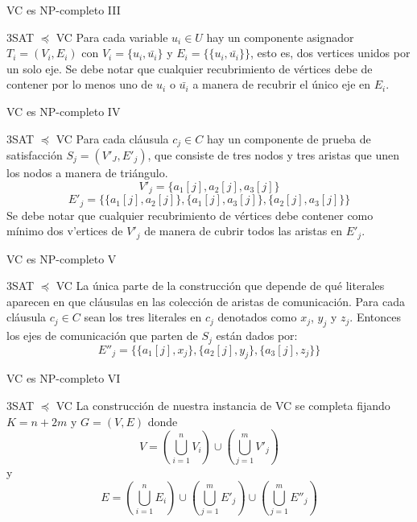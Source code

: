 \documentclass[10pt, mathserif, profesionalfont]{beamer}
\begin{document}
\begin{frame}{VC es NP-completo III}
    
\begin{block}{3SAT $\preceq$ VC}    
Para cada variable $u_i \in U$ hay un componente asignador $T_i=(V_i,E_i)$ con $V_i=\{u_i, \bar{u_i}\}$ y $E_i=\{\{u_i, \bar{u_i}\}\}$, esto es, dos vertices unidos por un solo eje. Se debe notar que cualquier recubrimiento de vértices debe de contener por lo menos uno de $u_i$ o $\bar{u_i}$ a manera de recubrir el único eje en $E_i$.
\end{block}

\end{frame}


\begin{frame}{VC es NP-completo IV}

\begin{block}{3SAT $\preceq$ VC}    
Para cada cláusula $c_j \in C$ hay un componente de prueba de satisfacción $S_j=(V'_J,E'_j)$, que consiste de tres nodos y tres aristas que unen los nodos a manera de triángulo.
\[V'_j=\{a_1[j],a_2[j],a_3[j]\}\]
\[E'_j=\{\{a_1[j],a_2[j]\},\{a_1[j],a_3[j]\},\{a_2[j],a_3[j]\}\}\]
Se debe notar que cualquier recubrimiento de vértices debe contener como mínimo dos v'ertices de $V'_j$ de manera de cubrir todos las aristas en $E'_j$.
\end{block}

\end{frame}


\begin{frame}{VC es NP-completo V}

\begin{block}{3SAT $\preceq$ VC}    
La única parte de la construcción que depende de qué literales aparecen en que cláusulas en las colección de aristas de comunicación. Para cada cláusula $c_j\in C$ sean los tres literales en $c_j$ denotados como $x_j$, $y_j$ y $z_j$. Entonces los ejes de comunicación que parten de $S_j$ están dados por:
\[E''_j=\{ \{a_1[j],x_j\}, \{a_2[j],y_j\}, \{a_3[j],z_j\} \}\]
\end{block}

\end{frame}


\begin{frame}{VC es NP-completo VI}

\begin{block}{3SAT $\preceq$ VC}    
La construcción de nuestra instancia de VC se completa fijando $K=n+2m$ y $G=(V,E)$ donde
\[V=(\bigcup^n_{i=1}V_i)\cup (\bigcup^m_{j=1}V'_j)\]
y
\[E=(\bigcup^n_{i=1}E_i)\cup (\bigcup^m_{j=1}E'_j)\cup (\bigcup^m_{j=1}E''_j)\]
\end{block}

\end{frame}
\end{document}
